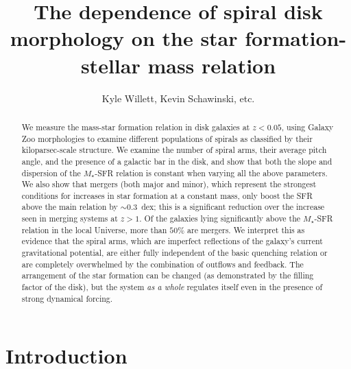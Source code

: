 \documentclass{emulateapj}
\begin{document}
\title{The dependence of spiral disk morphology on the star formation-stellar mass relation}

\author{Kyle Willett, Kevin Schawinski, etc.}





\begin{abstract}
We measure the mass-star formation relation in disk galaxies at $z<0.05$, using Galaxy Zoo morphologies to examine different populations of spirals as classified by their kiloparsec-scale structure. We examine the number of spiral arms, their average pitch angle, and the presence of a galactic bar in the disk, and show that both the slope and dispersion of the $M_\star$-SFR relation is constant when varying all the above parameters. We also show that mergers (both major and minor), which represent the strongest conditions for increases in star formation at a constant mass, only boost the SFR above the main relation by $\sim0.3$~dex; this is a significant reduction over the increase seen in merging systems at $z>1$. Of the galaxies lying significantly above the $M_\star$-SFR relation in the local Universe, more than $50\%$ are mergers. We interpret this as evidence that the spiral arms, which are imperfect reflections of the galaxy's current gravitational potential, are either fully independent of the basic quenching relation or are completely overwhelmed by the combination of outflows and feedback. The arrangement of the star formation can be changed (as demonstrated by the filling factor of the disk), but the system \emph{as a whole} regulates itself even in the presence of strong dynamical forcing. 
\end{abstract}



\section{Introduction} \label{sec-intro}
\end{document}
